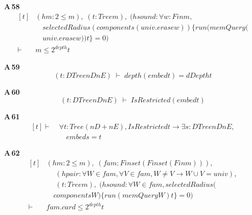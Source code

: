 \noindent\textbf{A\,58}\quad{}
{\footnotesize\[ \begin{aligned}[t]
&(\mathit{hm} : 2 \leq \mathit{m}),\; (\mathit{t} : \mathit{Tree} \mathit{m}),\; (\mathit{hsound} : \forall \mathit{w} : \mathit{Fin} \mathit{m},\\
&\quad \mathit{selectedRadius} (\mathit{components} (\mathit{univ}.\mathit{erase} \mathit{w})) \{ \mathit{run} (\mathit{memQuery} (\\
&\quad \mathit{univ}.\mathit{erase} \mathit{w})) \mathit{t}\} = 0)\\
\vdash\;&\mathit{m} \leq 2 ^{\mathit{depth}} \mathit{t}
\end{aligned} \]}

\noindent\textbf{A\,59}\quad{}
{\footnotesize\[ (\mathit{t} : \mathit{DTree} \mathit{nD} \mathit{nE}) \;\vdash\; \mathit{depth} (\mathit{embed} \mathit{t}) = \mathit{dDepth} \mathit{t} \]}

\noindent\textbf{A\,60}\quad{}
{\footnotesize\[ (\mathit{t} : \mathit{DTree} \mathit{nD} \mathit{nE}) \;\vdash\; \mathit{IsRestricted} (\mathit{embed} \mathit{t}) \]}

\noindent\textbf{A\,61}\quad{}
{\footnotesize\[ \begin{aligned}[t]
\vdash\;&\forall \mathit{t} : \mathit{Tree} (\mathit{nD} + \mathit{nE}), \mathit{IsRestricted} \mathit{t} \to \exists \mathit{s} : \mathit{DTree} \mathit{nD} \mathit{nE},\\
&\quad \mathit{embed} \mathit{s} = \mathit{t}
\end{aligned} \]}

\noindent\textbf{A\,62}\quad{}
{\footnotesize\[ \begin{aligned}[t]
&(\mathit{hm} : 2 \leq \mathit{m}),\; (\mathit{fam} : \mathit{Finset} (\mathit{Finset} (\mathit{Fin} \mathit{m}))),\\
&\quad \; (\mathit{hpair} : \forall \mathit{W} \in \mathit{fam}, \forall \mathit{V} \in \mathit{fam}, \mathit{W} \neq \mathit{V} \to \mathit{W} \cup \mathit{V} = \mathit{univ}),\\
&\quad \; (\mathit{t} : \mathit{Tree} \mathit{m}),\; (\mathit{hsound} : \forall \mathit{W} \in \mathit{fam}, \mathit{selectedRadius} (\\
&\quad \mathit{components} \mathit{W}) \{ \mathit{run} (\mathit{memQuery} \mathit{W}) \mathit{t}\} = 0)\\
\vdash\;&\mathit{fam}.\mathit{card} \leq 2 ^{\mathit{depth}} \mathit{t}
\end{aligned} \]}

